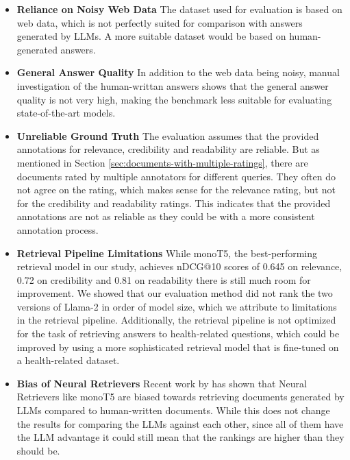 \begin{itemize}
    \item 	\textbf{Reliance on Noisy Web Data} The dataset used for evaluation is based on web data, which is not perfectly suited for comparison with answers generated by LLMs. A more suitable dataset would be based on human-generated answers.

    \item 	\textbf{General Answer Quality} In addition to the web data being noisy, manual investigation of the human-writtan answers shows that the general answer quality is not very high, making the benchmark less suitable for evaluating state-of-the-art models.

    \item 	\textbf{Unreliable Ground Truth} The evaluation assumes that the provided annotations for relevance, credibility and readability are reliable. But as mentioned in Section \ref{sec:documents-with-multiple-ratings}, there are documents rated by multiple annotators for different queries. They often do not agree on the rating, which makes sense for the relevance rating, but not for the credibility and readability ratings. This indicates that the provided annotations are not as reliable as they could be with a more consistent annotation process.

    \item 	\textbf{Retrieval Pipeline Limitations} While monoT5, the best-performing retrieval model in our study, achieves nDCG@10 scores of 0.645 on relevance, 0.72 on credibility and 0.81 on readability there is still much room for improvement. We showed that our evaluation method did not rank the two versions of Llama-2 in order of model size, which we attribute to limitations in the retrieval pipeline. Additionally, the retrieval pipeline is not optimized for the task of retrieving answers to health-related questions, which could be improved by using a more sophisticated retrieval model that is fine-tuned on a health-related dataset.

    \item   \textbf{Bias of Neural Retrievers} Recent work by \cite{dai:2023:llms} has shown that Neural Retrievers like monoT5 are biased towards retrieving documents generated by LLMs compared to human-written documents. While this does not change the results for comparing the LLMs against each other, since all of them have the LLM advantage it could still mean that the rankings are higher than they should be. 
\end{itemize}